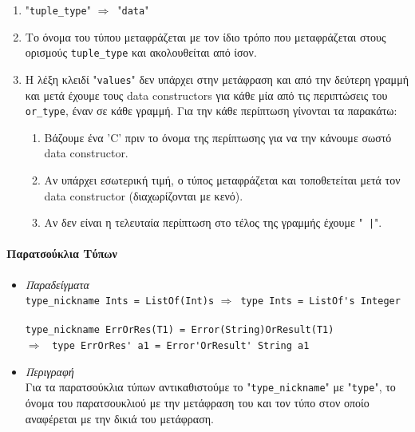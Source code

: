 \documentclass[diploma]{softlab-thesis}
\def\lra{$\Longrightarrow$\ }
\begin{document}
\begin{itemize}
\begin{enumerate}
\item
"\verb|tuple_type|" \lra "\texttt{data}"

\item
Το όνομα του τύπου μεταφράζεται με τον ίδιο τρόπο που μεταφράζεται στους
ορισμούς \verb|tuple_type| και ακολουθείται από ίσον.

\item
Η λέξη κλειδί "\texttt{values}" δεν υπάρχει στην μετάφραση και από την δεύτερη
γραμμή και μετά έχουμε τους data constructors για κάθε μία από τις περιπτώσεις
του \verb|or_type|, έναν σε κάθε γραμμή. Για την κάθε περίπτωση γίνονται τα
παρακάτω:

\begin{enumerate}

\item
Βάζουμε ένα 'C' πριν το όνομα της περίπτωσης για να την κάνουμε σωστό data
constructor.

\item
Αν υπάρχει εσωτερική τιμή, ο τύπος μεταφράζεται και τοποθετείται μετά τον
data constructor (διαχωρίζονται με κενό).

\item
Αν δεν είναι η τελευταία περίπτωση στο τέλος της γραμμής έχουμε "\texttt{ |}".

\end{enumerate}

\end{enumerate}

\end{itemize}

\newpage
\paragraph{Παρατσούκλια Τύπων}

\begin{itemize}
\item
\textit{Παραδείγματα}\\

\verb|type_nickname Ints = ListOf(Int)s| \lra \verb|type Ints = ListOf's Integer|
\\
\\
\verb|type_nickname ErrOrRes(T1) = Error(String)OrResult(T1)|
\\
\lra
\verb|type ErrOrRes' a1 = Error'OrResult' String a1|
\item
\textit{Περιγραφή}\\

Για τα παρατσούκλια τύπων αντικαθιστούμε το "\verb|type_nickname|" με
"\verb|type|", το όνομα του παρατσουκλιού με την μετάφραση του και
τον τύπο στον οποίο αναφέρεται με την δικιά του μετάφραση.

\end{itemize}
\end{document}
